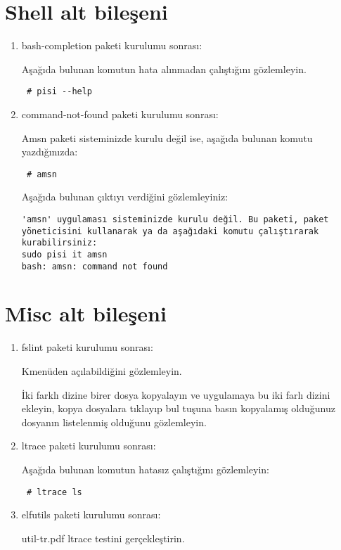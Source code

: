 \documentclass[a4paper,10pt]{article}
\begin{document}
\section{Shell alt bileşeni}
\begin{enumerate}
 \item bash-completion paketi kurulumu sonrası:

Aşağıda bulunan komutun hata alınmadan çalıştığını gözlemleyin.
\begin{verbatim}
 # pisi --help
\end{verbatim}

\item command-not-found paketi kurulumu sonrası:

Amsn paketi sisteminizde kurulu değil ise, aşağıda bulunan komutu yazdığınızda:
\begin{verbatim}
 # amsn
\end{verbatim}

Aşağıda bulunan çıktıyı verdiğini gözlemleyiniz:
\begin{verbatim}
'amsn' uygulaması sisteminizde kurulu değil. Bu paketi, paket yöneticisini kullanarak ya da aşağıdaki komutu çalıştırarak kurabilirsiniz:
sudo pisi it amsn
bash: amsn: command not found
\end{verbatim}

\end{enumerate}
\section{Misc alt bileşeni}
\begin{enumerate}
 \item fslint paketi kurulumu sonrası:

Kmenüden açılabildiğini gözlemleyin.

İki farklı dizine birer dosya kopyalayın ve uygulamaya bu iki farlı dizini ekleyin, kopya dosyalara tıklayıp bul tuşuna basın kopyalamış olduğunuz dosyanın listelenmiş olduğunu gözlemleyin.
 \item ltrace paketi kurulumu sonrası:

Aşağıda bulunan komutun hatasız çalıştığını gözlemleyin:
\begin{verbatim}
 # ltrace ls
\end{verbatim}
\item elfutils paketi kurulumu sonrası:

util-tr.pdf ltrace testini gerçekleştirin.
\end{enumerate}
\end{document}
